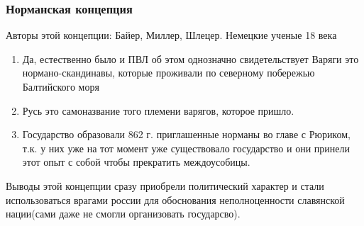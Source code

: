 \documentclass[a4paper]{article}
\begin{document}
\subsubsection{Норманская концепция}
Авторы этой концепции: Байер, Миллер, Шлецер. Немецкие ученые 18 века
\begin{enumerate}
\item Да, естественно было и ПВЛ об этом однозначно свидетельствует
Варяги это нормано-скандинавы, которые проживали по северному побережью Балтийского моря
\item Русь это самоназвание того племени варягов, которое пришло.
\item Государство образовали 862 г. приглашенные норманы во главе с Рюриком, т.к. у них уже на тот момент уже существовало государство и они принели этот опыт с собой чтобы прекратить междоусобицы.
\end{enumerate}
Выводы этой концепции сразу приобрели политический характер и стали использоваться врагами россии для обоснования неполноценности славянской нации(сами даже не смогли организовать государсво).
\end{document}
